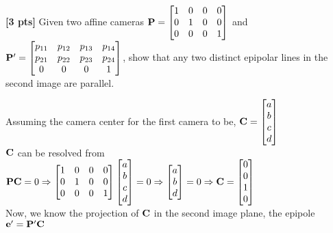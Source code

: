 \documentclass[11pt,addpoints,answers]{exam}
\numberwithin{equation}{section} %
\numberwithin{figure}{section} %
\numberwithin{table}{section} %
\begin{document}
\begin{questions}
\begin{tcolorbox}[fit,height=2cm, width=\textwidth, blank, borderline={0.5pt}{-2pt},halign=left, valign=center, nobeforeafter]
\end{tcolorbox}

\question \textbf{[3 pts]} Given two affine cameras $\mathbf{P} = \begin{bmatrix}
1 & 0 & 0 & 0 \\ 
0 & 1 & 0 & 0 \\
0 & 0 & 0 & 1
\end{bmatrix}$ and $\mathbf{P}' = \begin{bmatrix}
p_{11} & p_{12} & p_{13} & p_{14} \\ 
p_{21} & p_{22} & p_{23} & p_{24} \\ 
0 & 0 & 0 & 1
\end{bmatrix}$, show that any two distinct epipolar lines in the second image are parallel.

\begin{tcolorbox}[fit,height=6cm, width=\textwidth, blank, borderline={0.5pt}{-2pt},halign=left, valign=center, nobeforeafter]

Assuming the camera center for the first camera to be, $\mathbf{C} = \begin{bmatrix} a\\b\\c\\d \end{bmatrix}$\\
$\mathbf{C}$ can be resolved from $\mathbf{P} \mathbf{C} =0 \Rightarrow \begin{bmatrix}
1 & 0 & 0 & 0 \\ 
0 & 1 & 0 & 0 \\
0 & 0 & 0 & 1
\end{bmatrix} \begin{bmatrix} a\\b\\c\\d \end{bmatrix} =0 \Rightarrow \begin{bmatrix} a\\b\\d \end{bmatrix} =0 \Rightarrow \mathbf{C} = \begin{bmatrix} 0\\0\\1\\0 \end{bmatrix}$\\

Now, we know the projection of $\mathbf{C}$ in the second image plane, the epipole $\mathbf{e}' = \mathbf{P}' \mathbf{C}$\\


\end{tcolorbox}
\end{questions}
\end{document}
